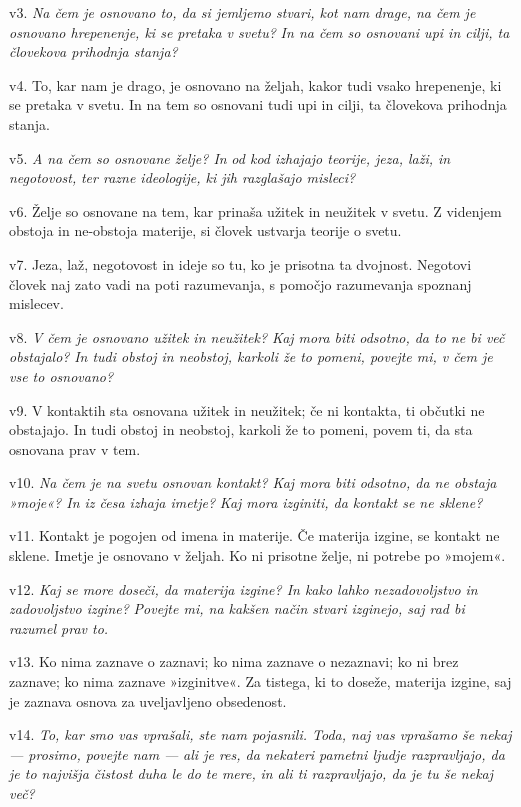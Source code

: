 v3. \emph{Na čem je osnovano to, da si jemljemo stvari, kot nam drage, na čem je osnovano hrepenenje, ki se pretaka v svetu?} \emph{In na čem so osnovani upi in cilji, ta človekova prihodnja stanja?}

v4. To, kar nam je drago, je osnovano na željah, kakor tudi vsako hrepenenje, ki se pretaka v svetu. In na tem so osnovani tudi upi in cilji, ta človekova prihodnja stanja.

v5. \emph{A na čem so osnovane želje? In} \emph{od kod izhajajo teorije, jeza, laži, in negotovost,} \emph{ter razne ideologije, ki jih razglašajo misleci?}

v6. Želje so osnovane na tem, kar prinaša užitek in neužitek v svetu. Z videnjem obstoja in ne-obstoja materije, si človek ustvarja teorije o svetu.

v7. Jeza, laž, negotovost in ideje so tu, ko je prisotna ta dvojnost. Negotovi človek naj zato vadi na poti razumevanja, s pomočjo razumevanja spoznanj mislecev.

v8. \emph{V čem je osnovano užitek in neužitek? Kaj mora biti odsotno, da to ne bi več obstajalo?} \emph{In tudi obstoj in neobstoj, karkoli že to pomeni, povejte mi, v čem je vse to osnovano?}

v9. V kontaktih sta osnovana užitek in neužitek; če ni kontakta, ti občutki ne obstajajo. In tudi obstoj in neobstoj, karkoli že to pomeni, povem ti, da sta osnovana prav v tem.

v10. \emph{Na čem je na svetu osnovan kontakt? Kaj mora biti odsotno, da ne obstaja »moje«? In iz česa izhaja imetje?} \emph{Kaj mora izginiti, da kontakt se ne sklene?}

v11. Kontakt je pogojen od imena in materije. Če materija izgine, se kontakt ne sklene. Imetje je osnovano v željah. Ko ni prisotne želje, ni potrebe po »mojem«.

v12. \emph{Kaj se more doseči, da materija izgine? In kako lahko nezadovoljstvo in zadovoljstvo izgine?} \emph{Povejte mi, na kakšen način stvari izginejo, saj rad bi razumel prav to.}

v13. Ko nima zaznave o zaznavi; ko nima zaznave o nezaznavi; ko ni brez zaznave; ko nima zaznave »izginitve«. Za tistega, ki to doseže, materija izgine, saj je zaznava osnova za uveljavljeno obsedenost.

v14. \emph{To, kar smo vas vprašali, ste nam pojasnili. Toda, naj vas vprašamo še nekaj --- prosimo, povejte nam ---} \emph{ali je res, da nekateri pametni ljudje razpravljajo, da je to najvišja čistost duha le do te mere,} \emph{in ali ti razpravljajo, da je tu še nekaj več?}

